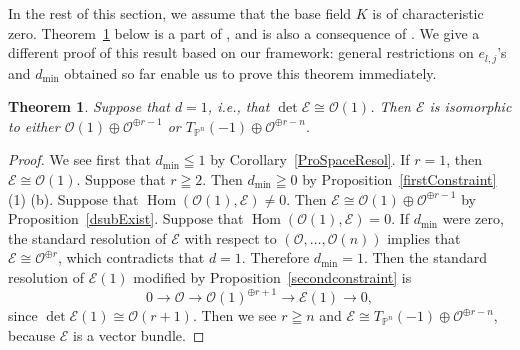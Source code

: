 \documentclass[a4paper,12pt]{amsart}
\newtheorem{thm}{Theorem}[section]
\DeclareMathOperator{\Hom}{Hom}
\begin{document}
In the rest of this section, we assume that the base field $K$ is of characteristic zero.
Theorem~\ref{d=1onProSpace} below is a part of \cite[Theorem 1]{pswnef},
and is also a consequence of \cite[IV-2.2 Proposition]{ellia}.
We give a different proof of this result based on our framework:
general restrictions on $e_{l,j}$'s and $d_{\min}$ obtained so far
enable us to prove this theorem immediately.

\begin{thm}\label{d=1onProSpace}
Suppose that $d=1$, i.e.,
that $\det\mathcal{E}\cong \mathcal{O}(1)$. Then $\mathcal{E}$ is isomorphic to either $\mathcal{O}(1)\oplus \mathcal{O}^{\oplus r-1}$
or $T_{\mathbb{P}^n}(-1)\oplus \mathcal{O}^{\oplus r-n}$.
\end{thm}
\begin{proof}
We see first that $d_{\min}\leqq 1$ by Corollary~\ref{ProSpaceResol}.
If $r=1$, then $\mathcal{E}\cong \mathcal{O}(1)$. Suppose that $r\geqq 2$. Then $d_{\min}\geqq 0$ by Proposition~\ref{firstConstraint} (1) (b).
Suppose that $\Hom (\mathcal{O}(1),\mathcal{E})\neq 0$.
Then $\mathcal{E}\cong \mathcal{O}(1)\oplus \mathcal{O}^{\oplus r-1}$
by Proposition~\ref{dsubExist}. Suppose that 
$\Hom (\mathcal{O}(1),\mathcal{E})=0$.
If $d_{\min}$ were zero,
the standard resolution of $\mathcal{E}$ with respect to $(\mathcal{O},\dots,\mathcal{O}(n))$ 
implies that $\mathcal{E}\cong \mathcal{O}^{\oplus r}$, which contradicts that $d=1$.
Therefore $d_{\min}=1$.
Then the standard resolution of $\mathcal{E}(1)$ modified by Proposition~\ref{secondconstraint} is 
\[0\to \mathcal{O}\to \mathcal{O}(1)^{\oplus r+1}\to \mathcal{E}(1)\to 0,\]
since $\det\mathcal{E}(1)\cong \mathcal{O}(r+1)$.
Then we see $r\geqq n$ and $\mathcal{E}\cong T_{\mathbb{P}^n}(-1)\oplus \mathcal{O}^{\oplus r-n}$,
because $\mathcal{E}$ is a vector bundle.
\end{proof}
\end{document}
